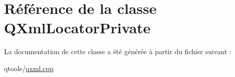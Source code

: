 \hypertarget{class_q_xml_locator_private}{}\section{Référence de la classe Q\+Xml\+Locator\+Private}
\label{class_q_xml_locator_private}


La documentation de cette classe a été générée à partir du fichier suivant \+:\begin{DoxyCompactItemize}
\item 
qtools/\hyperlink{qxml_8cpp}{qxml.\+cpp}\end{DoxyCompactItemize}
